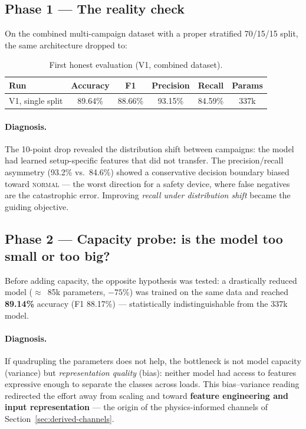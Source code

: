 \subsection{Phase 1 --- The reality check}

On the combined multi-campaign dataset with a proper stratified 70/15/15 split, the same architecture dropped to:

\begin{table}[H]
\centering
\caption{First honest evaluation (V1, combined dataset).}
\label{tab:phase1}
\renewcommand{\arraystretch}{1.25}
\small
\begin{tabular}{|l|c|c|c|c|c|}
\hline
\textbf{Run} & \textbf{Accuracy} & \textbf{F1} & \textbf{Precision} & \textbf{Recall} & \textbf{Params} \\
\hline
V1, single split & 89.64\% & 88.66\% & 93.15\% & 84.59\% & 337k \\
\hline
\end{tabular}
\end{table}

\paragraph{Diagnosis.} The 10-point drop revealed the distribution shift between campaigns: the model had learned setup-specific features that did not transfer. The precision/recall asymmetry (93.2\% vs.\ 84.6\%) showed a conservative decision boundary biased toward \textsc{normal} --- the worst direction for a safety device, where false negatives are the catastrophic error. Improving \emph{recall under distribution shift} became the guiding objective.

\subsection{Phase 2 --- Capacity probe: is the model too small or too big?}

Before adding capacity, the opposite hypothesis was tested: a drastically reduced model ($\approx$~85k parameters, $-75\%$) was trained on the same data and reached \textbf{89.14\%} accuracy (F1 88.17\%) --- statistically indistinguishable from the 337k model.

\paragraph{Diagnosis.} If quadrupling the parameters does not help, the bottleneck is not model capacity (variance) but \emph{representation quality} (bias): neither model had access to features expressive enough to separate the classes across loads. This bias--variance reading redirected the effort away from scaling and toward \textbf{feature engineering and input representation} --- the origin of the physics-informed channels of Section~\ref{sec:derived-channels}.


